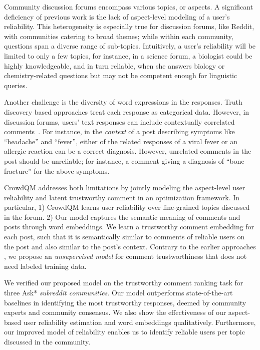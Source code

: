 Community discussion forums encompass various topics, or aspects. A significant deficiency of previous work is the lack of aspect-level modeling of a user's reliability.
This heterogeneity is especially true for discussion forums, like Reddit, with communities catering to broad themes; while within each community, questions span a diverse range of sub-topics. Intuitively, a user's reliability will be limited to only a few topics, for instance, in a science forum, a biologist could be highly knowledgeable, and in turn reliable, when she answers biology or chemistry-related questions but may not be competent enough for linguistic queries.

Another challenge is the diversity of word expressions in the responses. Truth discovery based approaches treat each response as categorical data. However, in discussion forums, users' text responses can include contextually correlated comments~\cite{zhang2018texttruth}. For instance, in the \emph{context} of a post describing symptoms like ``headache'' and ``fever'', either of the related responses of a viral fever or an allergic reaction can be a correct diagnosis. However, unrelated comments in the post should be unreliable; for instance, a comment giving a diagnosis of ``bone fracture'' for the above symptoms.

CrowdQM addresses both limitations by jointly modeling the aspect-level user reliability and latent trustworthy comment in an optimization framework.
In particular,
1) CrowdQM learns user reliability over fine-grained topics discussed in the forum.
2) Our model captures the semantic meaning of comments and posts through word embeddings.
We learn a trustworthy comment embedding for each post, such that it is semantically similar to comments of reliable users on the post and also similar to the post's context. Contrary to the earlier approaches \cite{Quality2008,barron2015thread,Mihaylova2019semeval}, we propose an \emph{unsupervised model} for comment trustworthiness that does not need labeled training data.

We verified our proposed model on the trustworthy comment ranking task for three Ask* \textit{subreddit communities}. Our model outperforms state-of-the-art baselines in identifying the most trustworthy responses, deemed by community experts and community consensus.
We also show the effectiveness of our aspect-based user reliability estimation and word embeddings qualitatively. Furthermore, our improved model of reliability enables us to identify reliable users per topic discussed in the community.

